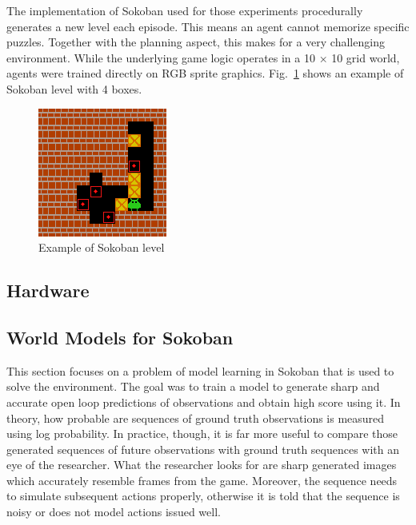 The implementation of Sokoban\cite{Code.Sokoban} used for those experiments procedurally generates a new level each episode. This means an agent cannot memorize specific puzzles. Together with the planning aspect, this makes for a very challenging environment. While the underlying game logic operates in a 10 × 10 grid world, agents were trained directly on RGB sprite graphics. Fig.~\ref{Fig.Sokoban} shows an example of Sokoban level with 4 boxes.


\begin{figure}[H]
\includegraphics[]{figures/Sokoban.png}
\caption[Sokoban]{Example of Sokoban level}
\label{Fig.Sokoban}
\end{figure}

\subsection{Hardware}


\subsection{World Models for Sokoban}

This section focuses on a problem of model learning in Sokoban that is used to solve the environment. The goal was to train a model to generate sharp and accurate open loop predictions of observations and obtain high score using it. In theory, how probable are sequences of ground truth observations is measured using log probability. In practice, though, it is far more useful to compare those generated sequences of future observations with ground truth sequences with an eye of the researcher. What the researcher looks for are sharp generated images which accurately resemble frames from the game. Moreover, the sequence needs to simulate subsequent actions properly, otherwise it is told that the sequence is noisy or does not model actions issued well.

